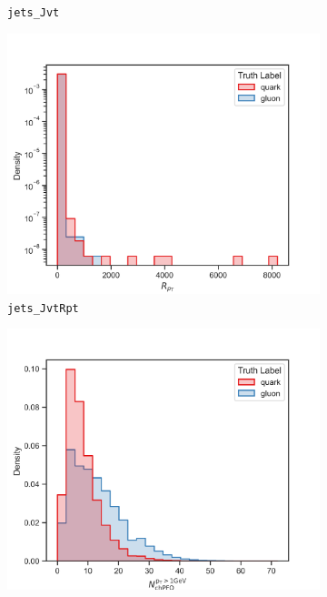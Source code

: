 \begin{figure}[!htb]
\begin{subfigure}[t]{0.49\textwidth}
		\caption{\texttt{jets\_Jvt}}
		\label{fig:highlevel_13}
	\end{subfigure}
	\begin{subfigure}[t]{0.49\textwidth}
		\includegraphics[width=1\textwidth]{src/plots/distributions/highlevel/jets_JvtRpt.png}
		\caption{\texttt{jets\_JvtRpt}}
		\label{fig:highlevel_14}
	\end{subfigure}
	\begin{subfigure}[t]{0.49\textwidth}
		\includegraphics[width=1\textwidth]{src/plots/distributions/highlevel/jets_NumChargedPFOPt1000[0].png}

\end{subfigure}
\end{figure}
